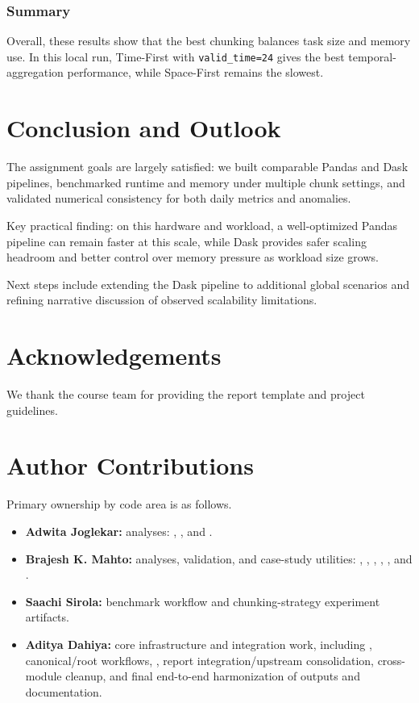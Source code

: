 \subsubsection{Summary}
Overall, these results show that the best chunking balances task size and
memory use. In this local run, Time-First with \verb|valid_time=24| gives the
best temporal-aggregation performance, while Space-First remains the slowest.

\section{Conclusion and Outlook}
The assignment goals are largely satisfied: we built comparable Pandas and
Dask pipelines, benchmarked runtime and memory under multiple chunk settings,
and validated numerical consistency for both daily metrics and anomalies.

Key practical finding: on this hardware and workload, a well-optimized Pandas
pipeline can remain faster at this scale, while Dask provides safer scaling
headroom and better control over memory pressure as workload size grows.

Next steps include extending the Dask pipeline to additional global scenarios
and refining narrative discussion of observed scalability limitations.

\section{Acknowledgements}
We thank the course team for providing the report template and project
guidelines.

\section{Author Contributions}
Primary ownership by code area is as follows.
\begin{itemize}
    \item \textbf{Adwita Joglekar:}  analyses:
    ,
    , and
    .
    \item \textbf{Brajesh K. Mahto:}  analyses,
    validation, and case-study utilities:
    ,
    ,
    ,
    ,
    , and
    .
    \item \textbf{Saachi Sirola:} 
    benchmark workflow and chunking-strategy experiment artifacts.
    \item \textbf{Aditya Dahiya:} core infrastructure and integration work,
    including , canonical/root workflows,
    , report integration/upstream consolidation,
    cross-module cleanup, and final end-to-end harmonization of outputs and
    documentation.
\end{itemize}

